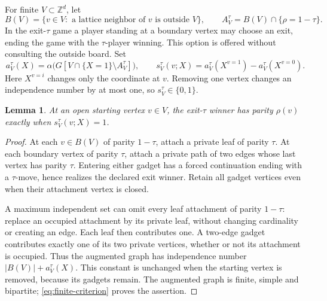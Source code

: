 \documentclass[11pt,a4paper]{article}
\newcommand{\Z}{\mathbb Z}
\newtheorem{lemma}[theorem]{Lemma}
\numberwithin{equation}{section}
\begin{document}
For finite $V\subset\Z^d$, let
\[
 B(V)=\{v\in V:\text{ a lattice neighbor of }v\text{ is outside }V\},
 \qquad A_V^\tau=B(V)\cap\{\rho=1-\tau\}.
\]
In the exit-$\tau$ game a player standing at a boundary vertex may choose
an exit, ending the game with the $\tau$-player winning. This option is
offered without consulting the outside board. Set
\begin{equation}\label{eq:boundary-alpha}
 a_V^\tau(X)=\alpha\bigl(G[V\cap\{X=1\}\setminus A_V^\tau]\bigr),
 \qquad
 s_V^\tau(v;X)=a_V^\tau(X^{v=1})-a_V^\tau(X^{v=0}).
\end{equation}
Here $X^{v=i}$ changes only the coordinate at $v$.
Removing one vertex changes an independence number by at most one, so
$s_V^\tau\in\{0,1\}$.

\begin{lemma}\label{lem:exit}
At an open starting vertex $v\in V$, the exit-$\tau$ winner has parity
$\rho(v)$ exactly when $s_V^\tau(v;X)=1$.
\end{lemma}
\begin{proof}
At each $v\in B(V)$ of parity $1-\tau$, attach a private leaf of parity
$\tau$. At each boundary vertex of parity $\tau$, attach a private path
of two edges whose last vertex has parity $\tau$. Entering either gadget
has a forced continuation ending with a $\tau$-move, hence realizes the
declared exit winner. Retain all gadget vertices even when their attachment
vertex is closed.

A maximum independent set can omit every leaf attachment of parity
$1-\tau$: replace an occupied attachment by its private leaf, without
changing cardinality or creating an edge. Each leaf then contributes one.
A two-edge gadget contributes exactly one of its two private vertices,
whether or not its attachment is occupied. Thus the augmented graph has
independence number $|B(V)|+a_V^\tau(X)$.
This constant is unchanged when the starting vertex is removed, because
its gadgets remain. The augmented graph is finite, simple and bipartite;
\eqref{eq:finite-criterion} proves the assertion.
\end{proof}
\end{document}

